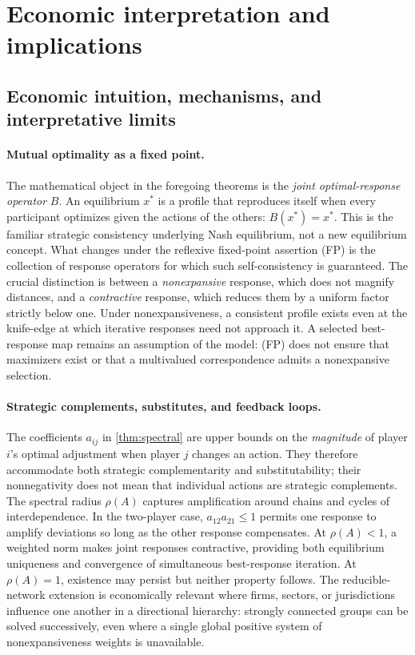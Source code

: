 \documentclass[11pt]{article}
\theoremstyle{definition}\newtheorem{definition}[theorem]{Definition}
\begin{document}
\section{Economic interpretation and implications}
\subsection{Economic intuition, mechanisms, and interpretative limits}\label{subsec:econintuition}

\paragraph{Mutual optimality as a fixed point.}
The mathematical object in the foregoing theorems is the \emph{joint optimal-response operator} $B$. An equilibrium $x^*$ is a profile that reproduces itself when every participant optimizes given the actions of the others: $B(x^*)=x^*$. This is the familiar strategic consistency underlying Nash equilibrium, not a new equilibrium concept. What changes under the reflexive fixed-point assertion (FP) is the collection of response operators for which such self-consistency is guaranteed. The crucial distinction is between a \emph{nonexpansive} response, which does not magnify distances, and a \emph{contractive} response, which reduces them by a uniform factor strictly below one. Under nonexpansiveness, a consistent profile exists even at the knife-edge at which iterative responses need not approach it. A selected best-response map remains an assumption of the model: (FP) does not ensure that maximizers exist or that a multivalued correspondence admits a nonexpansive selection.

\paragraph{Strategic complements, substitutes, and feedback loops.}
The coefficients $a_{ij}$ in \cref{thm:spectral} are upper bounds on the \emph{magnitude} of player $i$'s optimal adjustment when player $j$ changes an action. They therefore accommodate both strategic complementarity and substitutability; their nonnegativity does not mean that individual actions are strategic complements. The spectral radius $\rho(A)$ captures amplification around chains and cycles of interdependence. In the two-player case, $a_{12}a_{21}\le1$ permits one response to amplify deviations so long as the other response compensates. At $\rho(A)<1$, a weighted norm makes joint responses contractive, providing both equilibrium uniqueness and convergence of simultaneous best-response iteration. At $\rho(A)=1$, existence may persist but neither property follows. The reducible-network extension is economically relevant where firms, sectors, or jurisdictions influence one another in a directional hierarchy: strongly connected groups can be solved successively, even where a single global positive system of nonexpansiveness weights is unavailable.
\end{document}
